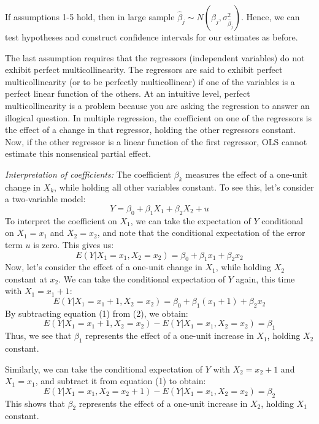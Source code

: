 \documentclass{./../../Latex/handout}
\begin{document}
If assumptions 1-5 hold, then in large sample $ \hat{\beta}_j \sim N (\beta_j, \sigma^2_{\hat{\beta}_j})$. Hence, we can test hypotheses and construct confidence intervals for our estimates as before. 

The last assumption requires that the regressors (independent variables) do not exhibit perfect multicollinearity. The regressors are said to exhibit perfect multicollinearity (or to be perfectly multicollinear) if one of the variables is a perfect linear function of the others. At an intuitive level, perfect multicollinearity is a problem because you are asking the regression to answer an illogical question. In multiple regression, the coefficient on one of the regressors is the effect of a change in that regressor, holding the other regressors constant. Now, if the other regressor is a linear function of the first regressor, OLS cannot estimate this nonsensical partial effect. 

\textit{Interpretation of coefficients:} The coefficient $\beta_k$ measures the effect of a one-unit change in $X_k$, while holding all other variables constant. To see this, let's consider a two-variable model:
$$ Y = \beta_0 + \beta_1 X_{1} + \beta_2 X_{2} + u  $$ 
To interpret the coefficient on $X_1$, we can take the expectation of $Y$ conditional on $X_1=x_1$ and $X_2=x_2$, and note that the conditional expectation of the error term $u$ is zero. This gives us:
\begin{equation}\label{one}
	E(Y|X_1=x_1, X_2=x_2) = \beta_0 + \beta_1 x_{1} + \beta_2 x_{2}
\end{equation} 
Now, let's consider the effect of a one-unit change in $X_1$, while holding $X_2$ constant at $x_2$. We can take the conditional expectation of $Y$ again, this time with $X_1=x_1+1$:
\begin{equation}\label{one}
 E(Y|X_1=x_1+1, X_2=x_2) = \beta_0 + \beta_1 (x_{1}+1) + \beta_2 x_{2}  
 \end{equation}  
By subtracting equation (1) from (2), we obtain:
$$ E(Y|X_1=x_1+1, X_2=x_2) -E(Y|X_1=x_1, X_2=x_2) = \beta_1 $$ 
Thus, we see that $\beta_1$ represents the effect of a one-unit increase in $X_1$, holding $X_2$ constant.

Similarly, we can take the conditional expectation of $Y$ with $X_2=x_2+1$ and $X_1=x_1$, and subtract it from equation (1) to obtain:
$$ E(Y|X_1=x_1, X_2=x_2+1) -E(Y|X_1=x_1, X_2=x_2) = \beta_2 $$ 
This shows that $\beta_2$ represents the effect of a one-unit increase in $X_2$, holding $X_1$ constant.
\end{document}
